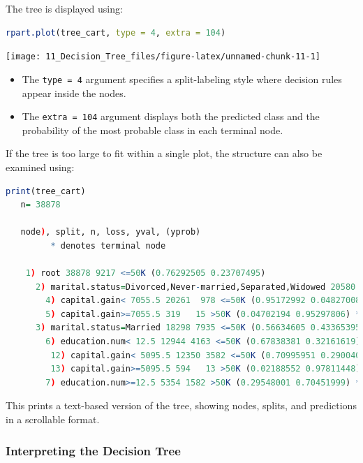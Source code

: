 \documentclass[
  11pt,
]{book}
\newcommand{\passthrough}[1]{#1}
\providecommand{\tightlist}{%
  \setlength{\itemsep}{0pt}\setlength{\parskip}{0pt}}
\theoremstyle{definition}
\theoremstyle{definition}
\theoremstyle{definition}
\theoremstyle{definition}
\theoremstyle{remark}
\begin{document}
The tree is displayed using:

\begin{lstlisting}[language=R]
rpart.plot(tree_cart, type = 4, extra = 104)
\end{lstlisting}

\begin{center}\texttt{[image: 11\_Decision\_Tree\_files/figure-latex/unnamed-chunk-11-1]} \end{center}

\begin{itemize}
\tightlist
\item
  The \passthrough{\lstinline!type = 4!} argument specifies a split-labeling style where decision rules appear inside the nodes.
\item
  The \passthrough{\lstinline!extra = 104!} argument displays both the predicted class and the probability of the most probable class in each terminal node.
\end{itemize}

If the tree is too large to fit within a single plot, the structure can also be examined using:

\begin{lstlisting}[language=R]
print(tree_cart)
   n= 38878 
   
   node), split, n, loss, yval, (yprob)
         * denotes terminal node
   
    1) root 38878 9217 <=50K (0.76292505 0.23707495)  
      2) marital.status=Divorced,Never-married,Separated,Widowed 20580 1282 <=50K (0.93770651 0.06229349)  
        4) capital.gain< 7055.5 20261  978 <=50K (0.95172992 0.04827008) *
        5) capital.gain>=7055.5 319   15 >50K (0.04702194 0.95297806) *
      3) marital.status=Married 18298 7935 <=50K (0.56634605 0.43365395)  
        6) education.num< 12.5 12944 4163 <=50K (0.67838381 0.32161619)  
         12) capital.gain< 5095.5 12350 3582 <=50K (0.70995951 0.29004049) *
         13) capital.gain>=5095.5 594   13 >50K (0.02188552 0.97811448) *
        7) education.num>=12.5 5354 1582 >50K (0.29548001 0.70451999) *
\end{lstlisting}

This prints a text-based version of the tree, showing nodes, splits, and predictions in a scrollable format.

\subsubsection*{Interpreting the Decision Tree}\label{interpreting-the-decision-tree}
\end{document}
